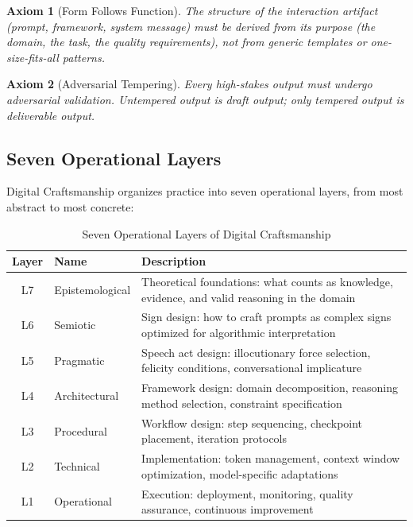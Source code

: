 \documentclass[12pt,a4paper]{article}
\newtheorem{axiom}{Axiom}[section]
\begin{document}
\begin{axiom}[Form Follows Function]
The structure of the interaction artifact (prompt, framework, system message) must be derived from its purpose (the domain, the task, the quality requirements), not from generic templates or one-size-fits-all patterns.
\end{axiom}

\begin{axiom}[Adversarial Tempering]
Every high-stakes output must undergo adversarial validation. Untempered output is draft output; only tempered output is deliverable output.
\end{axiom}

\subsection{Seven Operational Layers}

Digital Craftsmanship organizes practice into seven operational layers, from most abstract to most concrete:

\begin{table}[H]
\centering
\caption{Seven Operational Layers of Digital Craftsmanship}
\label{tab:layers}
\begin{tabular}{@{}clp{7.5cm}@{}}
\toprule
\textbf{Layer} & \textbf{Name} & \textbf{Description} \\
\midrule
L7 & Epistemological & Theoretical foundations: what counts as knowledge, evidence, and valid reasoning in the domain \\
L6 & Semiotic & Sign design: how to craft prompts as complex signs optimized for algorithmic interpretation \\
L5 & Pragmatic & Speech act design: illocutionary force selection, felicity conditions, conversational implicature \\
L4 & Architectural & Framework design: domain decomposition, reasoning method selection, constraint specification \\
L3 & Procedural & Workflow design: step sequencing, checkpoint placement, iteration protocols \\
L2 & Technical & Implementation: token management, context window optimization, model-specific adaptations \\
L1 & Operational & Execution: deployment, monitoring, quality assurance, continuous improvement \\
\bottomrule
\end{tabular}
\end{table}
\end{document}
